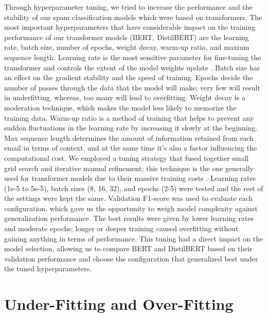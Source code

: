 \documentclass[11pt]{article}
\begin{document}
Through hyperparameter tuning, we tried to increase the performance and the stability of our spam classification models which were based on transformers. The most important hyperparameters that have considerable impact on the training performance of our transformer models (BERT, DistilBERT) \cite{devlin2019bert} are the learning rate, batch size, number of epochs, weight decay, warm-up ratio, and maxium sequence length.
Learning rate is the most sensitive parameter for fine-tuning the transformer and controls the extent of the model weights update . Batch size has an effect on the gradient stability and the speed of training. Epochs decide the number of passes through the data that the model will make; very few will result in underfitting, whereas, too many will lead to overfitting. Weight decay is a moderation technique, which makes the model less likely to memorize the training data. Warm-up ratio is a method of training that helps to prevent any sudden fluctuations in the learning rate by increasing it slowly at the beginning. Max sequence length determines the amount of information retained from each email in terms of context, and at the same time it's also a factor influencing the computational cost.
We employed a tuning strategy that fused together small grid search and iterative manual refinement; this technique is the one generally used for transformer models due to their massive training costs \cite{sanh2019distilbert}. Learning rates (1e-5 to 5e-5), batch sizes (8, 16, 32), and epochs (2-5) were tested and the rest of the settings were kept the same. Validation F1-score was used to evaluate each configuration, which gave us the opportunity to weigh model complexity against generalization performance. The best results were given by lower learning rates and moderate epochs; longer or deeper training caused overfitting without gaining anything in terms of performance. This tuning had a direct impact on the model selection, allowing us to compare BERT and DistilBERT based on their validation performance and choose the configuration that generalized best under the tuned hyperparameters.

\section{Under-Fitting and Over-Fitting}
\end{document}
